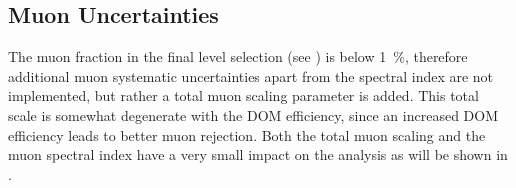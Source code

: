 \subsection{Muon Uncertainties}

The muon fraction in the final level selection (see ) is below \SI{1}{\percent}, therefore additional muon systematic uncertainties apart from the spectral index are not implemented, but rather a total muon scaling parameter is added. This total scale is somewhat degenerate with the DOM efficiency, since an increased DOM efficiency leads to better muon rejection. Both the total muon scaling and the muon spectral index have a very small impact on the analysis as will be shown in .
